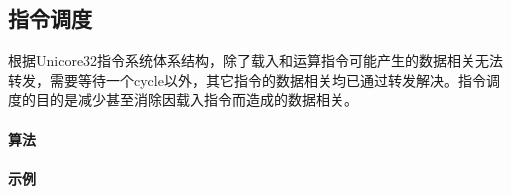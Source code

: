 \subsection{指令调度}
根据Unicore32指令系统体系结构，除了载入和运算指令可能产生的数据相关无法转发，需要等待一个cycle以外，其它指令的数据相关均已通过转发解决。指令调度的目的是减少甚至消除因载入指令而造成的数据相关。
\paragraph*{算法}

\paragraph*{示例}

